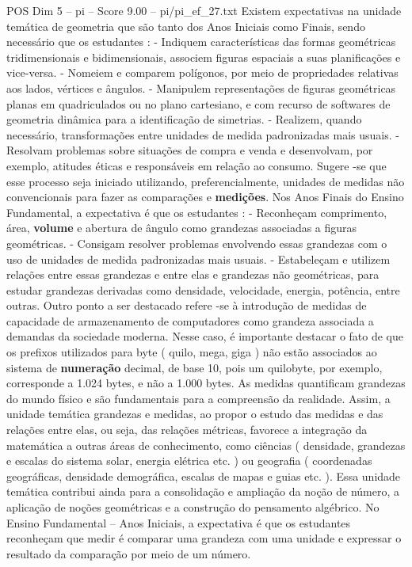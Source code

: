 \begin{textsample}{POS Dim 5 – pi – Score 9.00 – pi/pi\_ef\_27.txt}
Existem expectativas na unidade temática de geometria que são tanto dos Anos Iniciais como Finais, sendo necessário que os estudantes : - Indiquem características das formas geométricas tridimensionais e bidimensionais, associem figuras espaciais a suas planificações e vice-versa. - Nomeiem e comparem polígonos, por meio de propriedades relativas aos lados, vértices e ângulos. - Manipulem representações de figuras geométricas planas em quadriculados ou no plano cartesiano, e com recurso de softwares de geometria dinâmica para a identificação de simetrias. - Realizem, quando necessário, transformações entre unidades de medida padronizadas mais usuais. - Resolvam problemas sobre situações de compra e venda e desenvolvam, por exemplo, atitudes éticas e responsáveis em relação ao consumo.
Sugere -se que esse processo seja iniciado utilizando, preferencialmente, unidades de medidas não convencionais para fazer as comparações e \textbf{medições}.
Nos Anos Finais do Ensino Fundamental, a expectativa é que os estudantes : - Reconheçam comprimento, área, \textbf{volume} e abertura de ângulo como grandezas associadas a figuras geométricas. - Consigam resolver problemas envolvendo essas grandezas com o uso de unidades de medida padronizadas mais usuais. - Estabeleçam e utilizem relações entre essas grandezas e entre elas e grandezas não geométricas, para estudar grandezas derivadas como densidade, velocidade, energia, potência, entre outras.
Outro ponto a ser destacado refere -se à introdução de medidas de capacidade de armazenamento de computadores como grandeza associada a demandas da sociedade moderna.
Nesse caso, é importante destacar o fato de que os prefixos utilizados para byte ( quilo, mega, giga ) não estão associados ao sistema de \textbf{numeração} decimal, de base 10, pois um quilobyte, por exemplo, corresponde a 1.024 bytes, e não a 1.000 bytes.
As medidas quantificam grandezas do mundo físico e são fundamentais para a compreensão da realidade.
Assim, a unidade temática grandezas e medidas, ao propor o estudo das medidas e das relações entre elas, ou seja, das relações métricas, favorece a integração da matemática a outras áreas de conhecimento, como ciências ( densidade, grandezas e escalas do sistema solar, energia elétrica etc. ) ou geografia ( coordenadas geográficas, densidade demográfica, escalas de mapas e guias etc. ).
Essa unidade temática contribui ainda para a consolidação e ampliação da noção de número, a aplicação de noções geométricas e a construção do pensamento algébrico.
No Ensino Fundamental – Anos Iniciais, a expectativa é que os estudantes reconheçam que medir é comparar uma grandeza com uma unidade e expressar o resultado da comparação por meio de um número.

\end{textsample}
